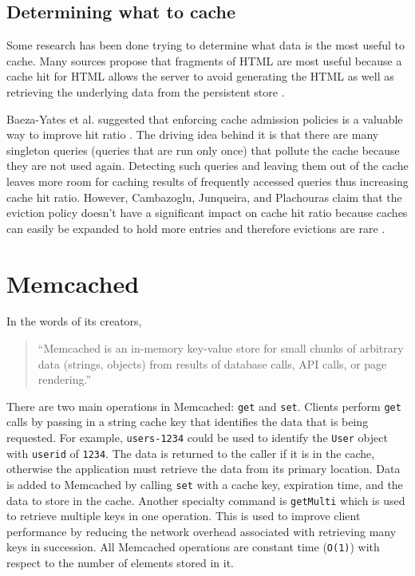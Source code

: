 \documentclass[12pt]{ucthesis}
\begin{document}
\subsection{Determining what to cache}
Some research has been done trying to determine what data is the most useful to cache.
Many sources propose that fragments of HTML are most useful because a cache hit for HTML allows the server to avoid generating the HTML as well as retrieving the underlying data from the persistent store \cite{comparisonOfCachingSolutions, scalableConsistentCaching, howBasecampGotSoFast}.

Baeza-Yates et al. suggested that enforcing cache admission policies is a valuable way to improve hit ratio \cite{cacheAdmissionPolicies}.
The driving idea behind it is that there are many singleton queries (queries that are run only once) that pollute the cache because they are not used again.
Detecting such queries and leaving them out of the cache leaves more room for caching results of frequently accessed queries thus increasing cache hit ratio.
However, Cambazoglu, Junqueira, and Plachouras claim that the eviction policy doesn't have a significant impact on cache hit ratio because caches can easily be expanded to hold more entries and therefore evictions are rare \cite{refreshingPerspectiveSearch}.


\section{Memcached}
In the words of its creators, \begin{quotation}``Memcached is an in-memory key-value store for small chunks of arbitrary data (strings, objects) from results of database calls, API calls, or page rendering\cite{memcachedDotOrg}.''\end{quotation}
There are two main operations in \textsf{Memcached}: {\tt get} and {\tt set}.
Clients perform {\tt get} calls by passing in a string cache key that identifies the data that is being requested.
For example, {\tt users-1234} could be used to identify the {\tt User} object with {\tt userid} of {\tt 1234}.
The data is returned to the caller if it is in the cache, otherwise the application must retrieve the data from its primary location.
Data is added to \textsf{Memcached} by calling {\tt set} with a cache key, expiration time, and the data to store in the cache.
Another specialty command is {\tt getMulti} which is used to retrieve multiple keys in one operation.
This is used to improve client performance by reducing the network overhead associated with retrieving many keys in succession.
All \textsf{Memcached} operations are constant time ({\tt O(1)}) with respect to the number of elements stored in it.
\end{document}
